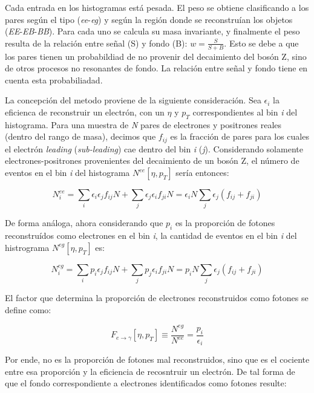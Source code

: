 Cada entrada en los histogramas está pesada. El peso se obtiene clasificando a los pares según el tipo (\textit{ee}-\textit{eg}) y según la región donde se reconstruían los objetos (\textit{EE}-\textit{EB}-\textit{BB}). Para cada uno se calcula su masa invariante, y finalmente el peso resulta de la relación entre señal (S) y fondo (B): $w=\frac{S}{S+B}$. Esto se debe a que los pares tienen un probabildiad de no provenir del decaimiento del bosón Z, sino de otros procesos no resonantes de fondo. La relación entre señal y fondo tiene en cuenta esta probabiliadad.

La concepción del metodo proviene de la siguiente consideración. Sea $\epsilon_{i}$ la eficienca de reconstruir un electrón, con un $\eta$ y $p_{T}$ correspondientes al bin \textit{i} del histograma. Para una muestra de \textit{N} pares de electrones y positrones reales (dentro del rango de masa), decimos que $f_{ij}$ es la fracción de pares para los cuales el electrón \textit{leading} (\textit{sub-leading}) cae dentro del bin \textit{i} (\textit{j}). Considerando solamente electrones-positrones provenientes del decaimiento de un bosón Z, el número de eventos en el bin \textit{i} del histograma $N^{ee}[\eta , p_{T}]$ sería entonces:

\begin{equation}
N_{i}^{ee} = \sum_{i}\epsilon_{i}\epsilon_{j}f_{ij}N + \sum_{j}\epsilon_{j}\epsilon_{i}f_{ji}N = \epsilon_{i}N\sum_{j}\epsilon_{j}(f_{ij}+f_{ji})
\end{equation}

De forma análoga, ahora considerando que $p_{i}$ es la proporción de fotones reconstruídos como electrones en el bin \textit{i}, la cantidad de eventos en el bin \textit{i} del histrograma $N^{eg}[\eta , p_{T}]$ es:

\begin{equation}
N_{i}^{eg} = \sum_{i}p_{i}\epsilon_{j}f_{ij}N + \sum_{j}p_{j}\epsilon_{i}f_{ji}N = p_{i}N\sum_{j}\epsilon_{j}(f_{ij}+f_{ji})
\end{equation}

El factor que determina la proporción de electrones reconstruidos como fotones se define como:

\begin{equation}
F_{e\rightarrow\gamma}[\eta , p_{T}]\equiv\frac{N^{eg}}{N^{ee}}=\frac{p_{i}}{\epsilon_{i}}
\end{equation}

Por ende, no es la proporción de fotones mal reconstruidos, sino que es el cociente entre esa proporción y la eficiencia de recosntruir un electrón. De tal forma de que el fondo correspondiente a electrones identificados como fotones resulte:

